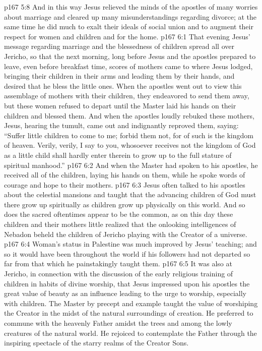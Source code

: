 \vs p167 5:8 And in this way Jesus relieved the minds of the apostles of many worries about marriage and cleared up many misunderstandings regarding divorce; at the same time he did much to exalt their ideals of social union and to augment their respect for women and children and for the home.
\vs p167 6:1 That evening Jesus’ message regarding marriage and the blessedness of children spread all over Jericho, so that the next morning, long before Jesus and the apostles prepared to leave, even before breakfast time, scores of mothers came to where Jesus lodged, bringing their children in their arms and leading them by their hands, and desired that he bless the little ones. When the apostles went out to view this assemblage of mothers with their children, they endeavored to send them away, but these women refused to depart until the Master laid his hands on their children and blessed them. And when the apostles loudly rebuked these mothers, Jesus, hearing the tumult, came out and indignantly reproved them, saying: \textcolor{ubdarkred}{“Suffer little children to come to me; forbid them not, for of such is the kingdom of heaven. Verily, verily, I say to you, whosoever receives not the kingdom of God as a little child shall hardly enter therein to grow up to the full stature of spiritual manhood.”}
\vs p167 6:2 And when the Master had spoken to his apostles, he received all of the children, laying his hands on them, while he spoke words of courage and hope to their mothers.
\pc \vs p167 6:3 Jesus often talked to his apostles about the celestial mansions and taught that the advancing children of God must there grow up spiritually as children grow up physically on this world. And so does the sacred oftentimes appear to be the common, as on this day these children and their mothers little realized that the onlooking intelligences of Nebadon beheld the children of Jericho playing with the Creator of a universe.
\pc \vs p167 6:4 Woman’s status in Palestine was much improved by Jesus’ teaching; and so it would have been throughout the world if his followers had not departed so far from that which he painstakingly taught them.
\pc \vs p167 6:5 It was also at Jericho, in connection with the discussion of the early religious training of children in habits of divine worship, that Jesus impressed upon his apostles the great value of beauty as an influence leading to the urge to worship, especially with children. The Master by precept and example taught the value of worshiping the Creator in the midst of the natural surroundings of creation. He preferred to commune with the heavenly Father amidst the trees and among the lowly creatures of the natural world. He rejoiced to contemplate the Father through the inspiring spectacle of the starry realms of the Creator Sons.
